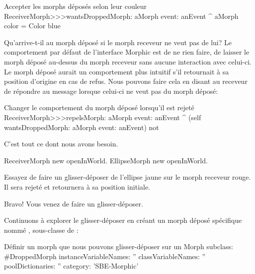 \documentclass[a4paper,10pt,twoside]{book}
\begin{document}
\begin{method}{Accepter les morphs déposés selon leur couleur}
ReceiverMorph>>>wantsDroppedMorph: aMorph event: anEvent
	^ aMorph color = Color blue
\end{method}

Qu'arrive-t-il au morph déposé si le morph receveur ne veut pas de lui?
Le comportement par défaut de l'interface Morphic est de ne rien
faire, \cad de laisser le morph déposé au-dessus du morph receveur
sans aucune interaction avec celui-ci. 
Le morph déposé aurait un comportement plus intuitif s'il
retournait \`a sa position d'origine en cas de refus.
Nous pouvons faire cela en disant au receveur de répondre 
au message   lorsque celui-ci ne
veut pas du morph déposé:

\begin{method}{Changer le comportement du morph déposé lorsqu'il est rejeté}
ReceiverMorph>>>repelsMorph: aMorph event: anEvent
	^ (self wantsDroppedMorph: aMorph event: anEvent) not
\end{method}

C'est tout ce dont nous avons besoin.

\begin{code}{}
ReceiverMorph new openInWorld.
EllipseMorph new openInWorld.
\end{code}
\noindent
Essayez de faire un glisser-déposer de l'ellipse jaune
 sur le morph receveur rouge. Il sera rejeté et
retournera \`a sa position initiale.


Bravo! Vous venez de faire un glisser-déposer.

Continuons \`a explorer le glisser-déposer en créant un morph
déposé spécifique nommé ,
sous-classe de :

\begin{classdef}{Définir un morph que nous pouvons glisser-déposer sur un }
Morph subclass: #DroppedMorph
	instanceVariableNames: ''
	classVariableNames: ''
	poolDictionaries: ''
	category: 'SBE-Morphic'
\end{classdef}
\end{document}
